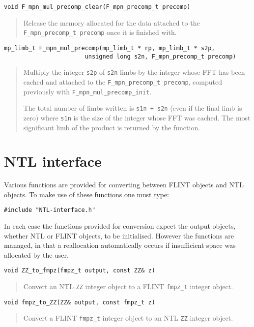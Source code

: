 \documentclass[a4paper,10pt]{article}
\newcommand{\code}{\lstinline}
\begin{document}
\begin{lstlisting}
void F_mpn_mul_precomp_clear(F_mpn_precomp_t precomp)
\end{lstlisting}
\begin{quote}
Release the memory allocated for the data attached to the \code{F_mpn_precomp_t precomp} once it is finished with.
\end{quote}

\begin{lstlisting}
mp_limb_t F_mpn_mul_precomp(mp_limb_t * rp, mp_limb_t * s2p, 
                       unsigned long s2n, F_mpn_precomp_t precomp)
\end{lstlisting}
\begin{quote}
Multiply the integer \code{s2p} of \code{s2n} limbs by the integer whose FFT has been cached and attached to the \code{F_mpn_precomp_t precomp}, computed previously with \code{F_mpn_mul_precomp_init}. 

The total number of limbs written is \code{s1n + s2n} (even if the final limb is zero) where \code{s1n} is the size of the integer whose FFT was cached. The most significant limb of the product is returned by the function.
\end{quote}
                      
\section{NTL interface}
Various functions are provided for converting between FLINT objects and NTL objects. To make use of these functions one must type:

\code{#include "NTL-interface.h"}

In each case the functions provided for conversion expect the output objects, whether NTL or FLINT objects, to be initialised. However the functions are managed, in that a reallocation automatically occurs if insufficient space was allocated by the user.

\begin{lstlisting}
void ZZ_to_fmpz(fmpz_t output, const ZZ& z)
\end{lstlisting}
\begin{quote}
Convert an NTL \code{ZZ} integer object to a FLINT \code{fmpz_t} integer object.
\end{quote}

\begin{lstlisting}
void fmpz_to_ZZ(ZZ& output, const fmpz_t z)
\end{lstlisting}
\begin{quote}
Convert a FLINT \code{fmpz_t} integer object to an NTL \code{ZZ} integer object.
\end{quote}
\end{document}
